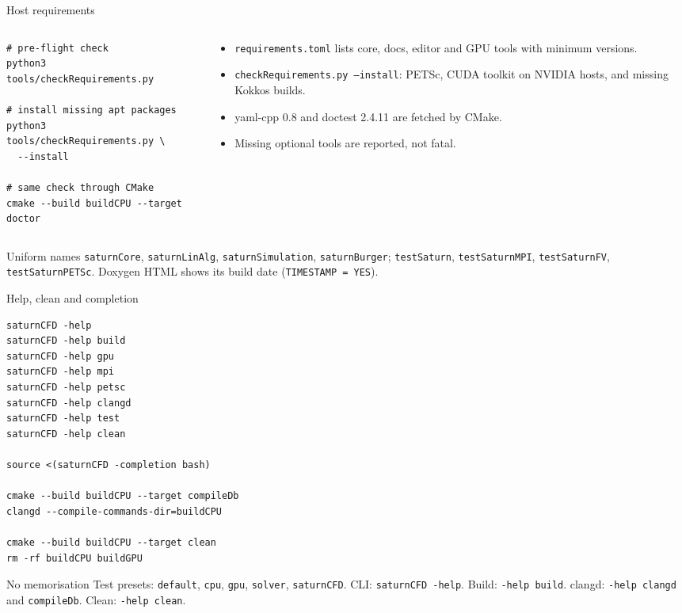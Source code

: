 \documentclass[aspectratio=169,10pt]{beamer}
\begin{document}
\begin{frame}[fragile]{Host requirements}
  \begin{columns}[T]
    \begin{column}{0.52\textwidth}
\begin{lstlisting}
# pre-flight check
python3 tools/checkRequirements.py

# install missing apt packages
python3 tools/checkRequirements.py \
  --install

# same check through CMake
cmake --build buildCPU --target doctor
\end{lstlisting}
    \end{column}
    \begin{column}{0.44\textwidth}
      \begin{itemize}
        \item \texttt{requirements.toml} lists core, docs, editor and GPU
              tools with minimum versions.
        \item \texttt{checkRequirements.py --install}: PETSc, CUDA toolkit on
              NVIDIA hosts, and missing Kokkos builds.
        \item yaml-cpp 0.8 and doctest 2.4.11 are fetched by CMake.
        \item Missing optional tools are reported, not fatal.
      \end{itemize}
    \end{column}
  \end{columns}

  \vspace{0.5em}
  \begin{block}{Uniform names}
    \texttt{saturnCore}, \texttt{saturnLinAlg}, \texttt{saturnSimulation},
    \texttt{saturnBurger}; \texttt{testSaturn}, \texttt{testSaturnMPI},
    \texttt{testSaturnFV}, \texttt{testSaturnPETSc}. Doxygen HTML shows its
    build date (\texttt{TIMESTAMP = YES}).
  \end{block}
\end{frame}

\begin{frame}[fragile]{Help, clean and completion}
\begin{lstlisting}
saturnCFD -help
saturnCFD -help build
saturnCFD -help gpu
saturnCFD -help mpi
saturnCFD -help petsc
saturnCFD -help clangd
saturnCFD -help test
saturnCFD -help clean

source <(saturnCFD -completion bash)

cmake --build buildCPU --target compileDb
clangd --compile-commands-dir=buildCPU

cmake --build buildCPU --target clean
rm -rf buildCPU buildGPU
\end{lstlisting}

  \begin{block}{No memorisation}
    Test presets: \texttt{default}, \texttt{cpu}, \texttt{gpu},
    \texttt{solver}, \texttt{saturnCFD}. CLI: \texttt{saturnCFD -help}.
    Build: \texttt{-help build}. clangd: \texttt{-help clangd} and
    \texttt{compileDb}. Clean: \texttt{-help clean}.
  \end{block}
\end{frame}
\end{document}
